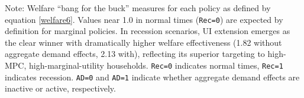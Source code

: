 \documentclass[\latexroot/\projectname]{subfiles}
\begin{document}
\begin{table}[tb] 
  \caption{\pregenmark Welfare effectiveness: policy ``bang for the buck'' comparison}
  \whenintegrated{\label{tab:welfare6}}
  \centering


  \parbox{\textwidth}{
    \medskip
    \footnotesize Note: Welfare ``bang for the buck'' measures for each policy as defined by equation \eqref{welfare6}. Values near 1.0 in normal times (\texttt{Rec=0}) are expected by definition for marginal policies. In recession scenarios, UI extension emerges as the clear winner with dramatically higher welfare effectiveness (1.82 without aggregate demand effects, 2.13 with), reflecting its superior targeting to high-MPC, high-marginal-utility households. \texttt{Rec=0} indicates normal times, \texttt{Rec=1} indicates recession. \texttt{AD=0} and \texttt{AD=1} indicate whether aggregate demand effects are inactive or active, respectively.
  }

\end{table}

\vspace{0.5em}

\smartbib
\end{document}
